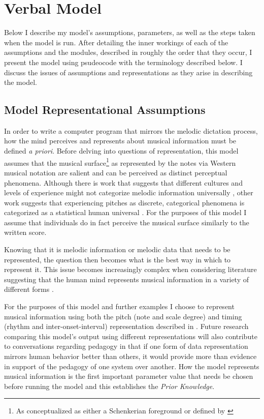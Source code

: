 \documentclass[]{book}
\let\rmarkdownfootnote\footnote%
\def\footnote{\protect\rmarkdownfootnote}
\begin{document}
\hypertarget{verbal-model}{%
\section{Verbal Model}\label{verbal-model}}

Below I describe my model's assumptions, parameters, as well as the steps taken when the model is run.
After detailing the inner workings of each of the assumptions and the modules, described in roughly the order that they occur, I present the model using psudeocode with the terminology described below.
I discuss the issues of assumptions and representations as they arise in describing the model.

\hypertarget{model-representational-assumptions}{%
\subsection{Model Representational Assumptions}\label{model-representational-assumptions}}

In order to write a computer program that mirrors the melodic dictation process, how the mind perceives and represents about musical information must be defined \emph{a priori}.
Before delving into questions of representation, this model assumes that the musical surface\footnote{As conceptualized as either a Schenkerian foreground \citep{schenkerFreieSatz1935} or defined by \citet{lerdahlGenerativeTheoryTonal1986}} as represented by the notes via Western musical notation are salient and can be perceived as distinct perceptual phenomena.
Although there is work that suggests that different cultures and levels of experience might not categorize melodic information universally \citep{mcdermottIndifferenceDissonanceNative2016}, other work suggests that experiencing pitches as discrete, categorical phenomena is categorized as a statistical human universal \citep{savageStatisticalUniversalsReveal2015}.
For the purposes of this model I assume that individuals do in fact perceive the musical surface similarly to the written score.

Knowing that it is melodic information or melodic data that needs to be represented, the question then becomes what is the best way in which to represent it.
This issue becomes increasingly complex when considering literature suggesting that the human mind represents musical information in a variety of different forms \citep{krumhanslCognitiveFoundationsMusical2001, levitinCurrentAdvancesCognitive2009}.

For the purposes of this model and further examples I choose to represent musical information using both the pitch (note and scale degree) and timing (rhythm and inter-onset-interval) representation described in \citet{pearceStatisticalLearningProbabilistic2018a}.
Future research comparing this model's output using different representations will also contribute to conversations regarding pedagogy in that if one form of data representation mirrors human behavior better than others, it would provide more than evidence in support of the pedagogy of one system over another.
How the model represents musical information is the first important parameter value that needs be chosen before running the model and this establishes the \emph{Prior Knowledge}.
\end{document}
